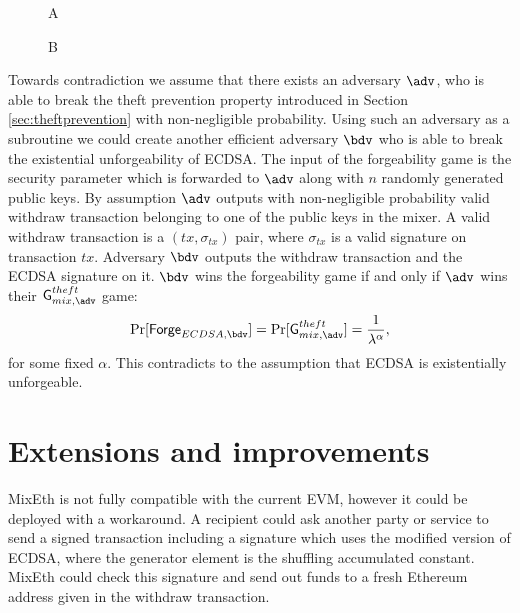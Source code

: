 \documentclass[a4paper,UKenglish,cleveref, autoref]{oasics-v2019}
\begin{document}
\begin{appendices}
\begin{wrapfigure}{r}{0.5\textwidth}
\begin{bbrenv}{A}
\begin{bbrbox} [name=\bdv]
				\begin{bbrenv}{B}
					\begin{bbrbox}[name=\adv]
					\end{bbrbox}
					
				\end{bbrenv}
				
			\end{bbrbox}
		\end{bbrenv}
		
	\end{wrapfigure}
	
	Towards contradiction we assume that there exists an adversary $\adv$, who is able to break the theft prevention property introduced in Section \ref{sec:theftprevention} with non-negligible probability. Using such an adversary as a subroutine we could create another efficient adversary $\bdv$ who is able to break the existential unforgeability of ECDSA. The input of the forgeability game is the security parameter which is forwarded to $\adv$ along with $n$ randomly generated public keys. By assumption $\adv$ outputs with non-negligible probability valid withdraw transaction belonging to one of the public keys in the mixer. A valid withdraw transaction is a $(tx,\sigma_{tx})$ pair, where $\sigma_{tx}$ is a valid signature on transaction $tx$. Adversary $\bdv$ outputs the withdraw transaction and the ECDSA signature on it. $\bdv$ wins the forgeability game if and only if $\adv$ wins their $\textsf{G}^{theft}_{mix,\adv}$ game:
	$$\Pr[\textsf{Forge}_{ECDSA,\bdv}]=\Pr[\textsf{G}^{theft}_{mix, \adv}]=\frac{1}{\lambda^\alpha}, $$ for some fixed $\alpha$. This contradicts to the assumption that ECDSA is existentially unforgeable.
	
\section{Extensions and improvements}
MixEth is not fully compatible with the current EVM, however it could be deployed with a workaround. A recipient could ask another party or service to send a signed transaction including a signature which uses the modified version of ECDSA, where the generator element is the shuffling accumulated constant. MixEth could check this signature and send out funds to a fresh Ethereum address given in the withdraw transaction.


\end{appendices}
\end{document}
